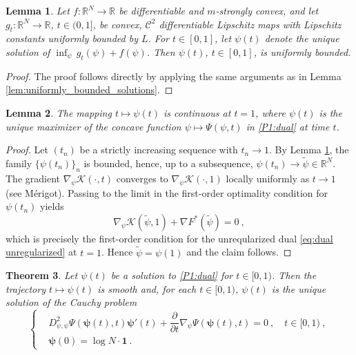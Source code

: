 \documentclass{scrartcl}
\newcommand{\R}{{\mathbb R}}
\theoremstyle{plain}
\newtheorem{thm}{Theorem}[section]
\newtheorem{lem}[thm]{Lemma}
\theoremstyle{definition}
\begin{document}
\begin{lem}\label{lem:bound_sol}
    Let $f : \R^N \to \R$ be differentiable and $m$-strongly convex, and let $g_t : \R^N \to \R$, $t \in (0,1]$, be convex, $\mathcal{C}^2$ differentiable Lipschitz maps with Lipschitz constants uniformly bounded by $L$. For $t \in [0,1]$, let $\psi(t)$ denote the unique solution of $\inf_{\psi} \, g_t(\psi) + f(\psi)$. Then $\psi(t)$, $t \in [0,1]$, is uniformly bounded.
\end{lem}

\begin{proof}
    The proof follows directly by applying the same arguments as in Lemma \ref{lem:uniformly_bounded_solutions}.
\end{proof}

\begin{lem}\label{lem:cont_no_t}
    The mapping $t\mapsto\psi(t)$ is continuous at $t=1$, where $\psi(t)$ is the unique maximizer of the concave function $\psi \mapsto \Psi(\psi,t)$ in \eqref{P1:dual} at time $t$.
\end{lem}
\begin{proof}
    Let $(t_n)$ be a strictly increasing sequence with $t_n\to 1$. By Lemma \ref{lem:bound_sol}, the family $\{\psi(t_n)\}_n$ is bounded, hence, up to a subsequence, $\psi(t_n)\to\widetilde{\psi}\in\R^N$. The gradient $\nabla_\psi\mathcal{K}(\cdot,t)$ converges to $\nabla_\psi\mathcal{K}(\cdot,1)$ locally uniformly as $t\to 1$ (see Mérigot). Passing to the limit in the first-order optimality condition for $\psi(t_n)$ yields
    \[
        \nabla_\psi\mathcal{K}(\widetilde{\psi},1) + \nabla F^*(\widetilde{\psi}) = 0\ ,
    \]
    which is precisely the first-order condition for the unreqularized dual \eqref{eq:dual unregularized} at $t=1$. Hence $\widetilde{\psi}=\psi(1)$ and the claim follows.
\end{proof}

\begin{thm}\label{thm:well-posed1}
    Let $\psi(t)$ be a solution to \eqref{P1:dual} for $t \in [0,1)$. Then the trajectory $t \mapsto \psi(t)$ is smooth and, for each $t \in [0,1)$, $\psi(t)$ is the unique solution of the Cauchy problem
    \begin{equation}\label{cauchy1}
    \boxed{
    \begin{cases}
        &D_{\psi,\psi}^2\Psi(\mathbf{\psi}(t),t)\mathbf{\psi}'(t) + \dfrac{\partial}{\partial t}\nabla_\psi\Psi(\mathbf{\psi}(t),t) = 0\ ,\quad t \in [0,1)\ , \\
        &\mathbf{\psi}(0)= \log N \cdot \mathbf{1}\ .
    \end{cases}
    }
    \end{equation}
\end{thm}
\end{document}

